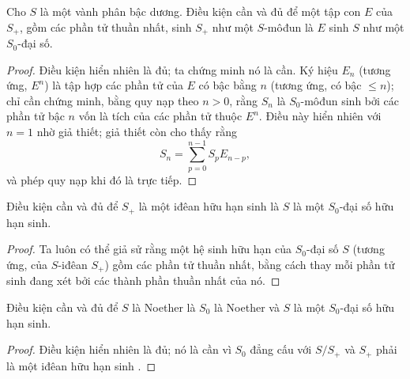 \documentclass[oneside,10pt]{amsart}
\renewcommand{\leq}{\leqslant}
\let\EGAOriginalLabel\label
\renewcommand{\label}[1]{\phantomsection\EGAOriginalLabel{#1}}
\begin{document}
\begin{lemma}[2.1.3]
\label{II.2.1.3}
Cho $S$ là một vành phân bậc dương.
Điều kiện cần và đủ để một tập con $E$ của $S_+$, gồm các phần tử thuần nhất, sinh $S_+$ như một $S$-môđun là $E$ sinh $S$ như một $S_0$-đại số.
\end{lemma}

\begin{proof}
Điều kiện hiển nhiên là đủ; ta chứng minh nó là cần.
Ký hiệu $E_n$ (tương ứng, $E^n$) là tập hợp các phần tử của $E$ có bậc bằng $n$ (tương ứng, có bậc $\leq n$); chỉ cần chứng minh, bằng quy nạp theo $n>0$, rằng $S_n$ là $S_0$-môđun sinh bởi các phần tử bậc $n$ vốn là tích của các phần tử thuộc $E^n$.
Điều này hiển nhiên với $n=1$ nhờ giả thiết; giả thiết còn cho thấy rằng
\[
  S_n=\sum_{p=0}^{n-1}S_pE_{n-p},
\]
và phép quy nạp khi đó là trực tiếp.
\end{proof}

\begin{corollary}[2.1.4]
\label{II.2.1.4}
Điều kiện cần và đủ để $S_+$ là một iđêan hữu hạn sinh là $S$ là một $S_0$-đại số hữu hạn sinh.
\end{corollary}

\begin{proof}
Ta luôn có thể giả sử rằng một hệ sinh hữu hạn của $S_0$-đại số $S$ (tương ứng, của $S$-iđêan $S_+$) gồm các phần tử thuần nhất, bằng cách thay mỗi phần tử sinh đang xét bởi các thành phần thuần nhất của nó.
\end{proof}

\begin{corollary}[2.1.5]
\label{II.2.1.5}
Điều kiện cần và đủ để $S$ là Noether là $S_0$ là Noether và $S$ là một $S_0$-đại số hữu hạn sinh.
\end{corollary}

\begin{proof}
Điều kiện hiển nhiên là đủ; nó là cần vì $S_0$ đẳng cấu với $S/S_+$ và $S_+$ phải là một iđêan hữu hạn sinh .
\end{proof}
\end{document}
